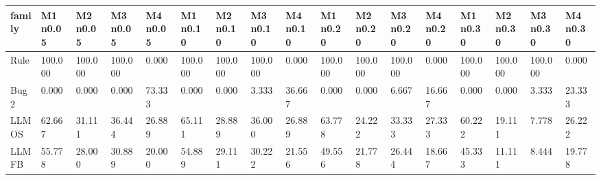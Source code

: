 \begin{tabular}{lllllllllllllllll}
\hline
family & M1 n0.05 & M2 n0.05 & M3 n0.05 & M4 n0.05 & M1 n0.10 & M2 n0.10 & M3 n0.10 & M4 n0.10 & M1 n0.20 & M2 n0.20 & M3 n0.20 & M4 n0.20 & M1 n0.30 & M2 n0.30 & M3 n0.30 & M4 n0.30 \\
\hline
Rule & 100.000 & 100.000 & 100.000 & 0.000 & 100.000 & 100.000 & 100.000 & 0.000 & 100.000 & 100.000 & 100.000 & 0.000 & 100.000 & 100.000 & 100.000 & 0.000 \\
Bug2 & 0.000 & 0.000 & 0.000 & 73.333 & 0.000 & 0.000 & 3.333 & 36.667 & 0.000 & 0.000 & 6.667 & 16.667 & 0.000 & 0.000 & 3.333 & 23.333 \\
LLM OS & 62.667 & 31.111 & 36.444 & 26.889 & 65.111 & 28.889 & 36.000 & 26.889 & 63.778 & 24.222 & 33.333 & 27.333 & 60.222 & 19.111 & 7.778 & 26.222 \\
LLM FB & 55.778 & 28.000 & 30.889 & 20.000 & 54.889 & 29.111 & 30.222 & 21.556 & 49.556 & 21.778 & 26.444 & 18.667 & 45.333 & 11.111 & 8.444 & 19.778 \\
\hline
\end{tabular}
